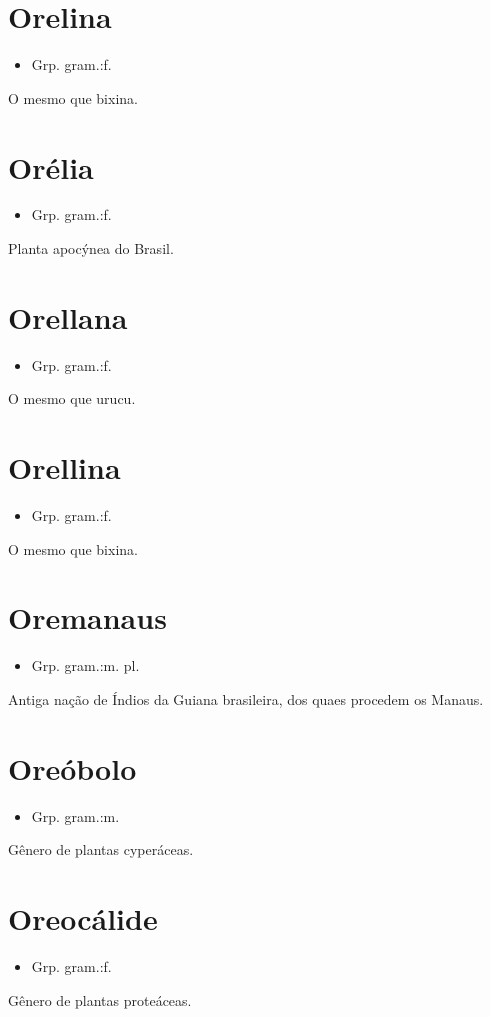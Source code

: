 \section{Orelina}
\begin{itemize}
\item {Grp. gram.:f.}
\end{itemize}
O mesmo que \textunderscore bixina\textunderscore .
\section{Orélia}
\begin{itemize}
\item {Grp. gram.:f.}
\end{itemize}
Planta apocýnea do Brasil.
\section{Orellana}
\begin{itemize}
\item {Grp. gram.:f.}
\end{itemize}
O mesmo que \textunderscore urucu\textunderscore .
\section{Orellina}
\begin{itemize}
\item {Grp. gram.:f.}
\end{itemize}
O mesmo que \textunderscore bixina\textunderscore .
\section{Oremanaus}
\begin{itemize}
\item {Grp. gram.:m. pl.}
\end{itemize}
Antiga nação de Índios da Guiana brasileira, dos quaes procedem os Manaus.
\section{Oreóbolo}
\begin{itemize}
\item {Grp. gram.:m.}
\end{itemize}
Gênero de plantas cyperáceas.
\section{Oreocálide}
\begin{itemize}
\item {Grp. gram.:f.}
\end{itemize}
Gênero de plantas proteáceas.

